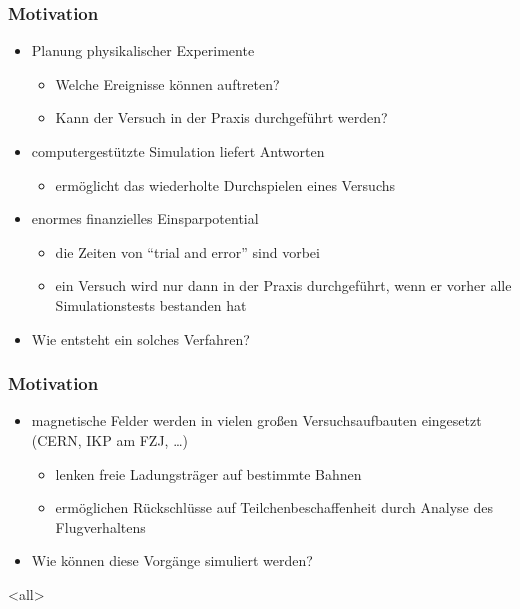 \mode*

\begin{frame}
  \frametitle{Motivation}
  \onslide<+->
  \begin{itemize}
    \item<+-> Planung physikalischer Experimente
    \begin{itemize}
      \item<+-> Welche Ereignisse k\"onnen auftreten?
      \item<+-> Kann der Versuch in der Praxis durchgef\"uhrt werden?
    \end{itemize}
    \item<+-> computergest\"utzte Simulation liefert Antworten
      \begin{itemize}
        \item<+-> erm\"oglicht das wiederholte Durchspielen eines Versuchs
      \end{itemize}
    \item<+-> enormes finanzielles Einsparpotential
      \begin{itemize}
        \item<+-> die Zeiten von "`trial and error"' sind vorbei
        \item<+-> ein Versuch wird nur dann in der Praxis durchgef\"uhrt,
          wenn er vorher alle Simulationstests bestanden hat
      \end{itemize}
    \item<+-> Wie entsteht ein solches Verfahren?
  \end{itemize}
\end{frame}

\begin{frame}
  \frametitle{Motivation}
  \onslide<+->
  \begin{itemize}
    \item<+-> magnetische Felder werden in vielen gro{\ss}en
      Versuchsaufbauten eingesetzt (CERN, IKP am FZJ, \ldots)
    \begin{itemize}
      \item<+-> lenken freie Ladungstr\"ager auf bestimmte Bahnen
      \item<+-> erm\"oglichen R\"uckschl\"usse auf Teilchenbeschaffenheit
        durch Analyse des Flugverhaltens
    \end{itemize}
    \item<+-> Wie k\"onnen diese Vorg\"ange simuliert werden?
  \end{itemize}
\end{frame}
\mode<all>
